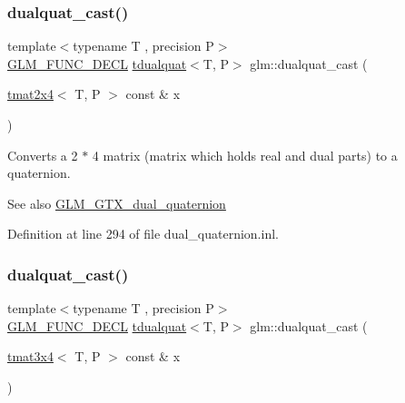 \subsubsection{\texorpdfstring{dualquat\_cast()}{dualquat\_cast()}\hspace{0.1cm}{\footnotesize\ttfamily [1/2]}}
{\footnotesize\ttfamily template$<$typename T , precision P$>$ \\
\mbox{\hyperlink{setup_8hpp_ab2d052de21a70539923e9bcbf6e83a51}{G\+L\+M\+\_\+\+F\+U\+N\+C\+\_\+\+D\+E\+CL}} \mbox{\hyperlink{structglm_1_1tdualquat}{tdualquat}}$<$T, P$>$ glm\+::dualquat\+\_\+cast (\begin{DoxyParamCaption}\item[{\mbox{\hyperlink{structglm_1_1tmat2x4}{tmat2x4}}$<$ T, P $>$ const \&}]{x }\end{DoxyParamCaption})}

Converts a 2 $\ast$ 4 matrix (matrix which holds real and dual parts) to a quaternion.

\begin{DoxySeeAlso}{See also}
\mbox{\hyperlink{group__gtx__dual__quaternion}{G\+L\+M\+\_\+\+G\+T\+X\+\_\+dual\+\_\+quaternion}} 
\end{DoxySeeAlso}


Definition at line 294 of file dual\+\_\+quaternion.\+inl.

\mbox{\label{group__gtx__dual__quaternion_ga20eb5758beb73cc6dbc2d9104f03ec20}} 
\subsubsection{\texorpdfstring{dualquat\_cast()}{dualquat\_cast()}\hspace{0.1cm}{\footnotesize\ttfamily [2/2]}}
{\footnotesize\ttfamily template$<$typename T , precision P$>$ \\
\mbox{\hyperlink{setup_8hpp_ab2d052de21a70539923e9bcbf6e83a51}{G\+L\+M\+\_\+\+F\+U\+N\+C\+\_\+\+D\+E\+CL}} \mbox{\hyperlink{structglm_1_1tdualquat}{tdualquat}}$<$T, P$>$ glm\+::dualquat\+\_\+cast (\begin{DoxyParamCaption}\item[{\mbox{\hyperlink{structglm_1_1tmat3x4}{tmat3x4}}$<$ T, P $>$ const \&}]{x }\end{DoxyParamCaption})}

